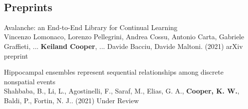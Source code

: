 \documentclass[10pt]{cooperCV2}
\begin{document}
%	






\needspace{\headerpush}
\myRule{\columnwidth}{1pt}\\


 
 
	

\subsection{Preprints} 
\begin{etaremune}[itemindent=-1.5\bibhang, topsep=0pt,
				   itemsep=\bibsep,partopsep=0pt,parsep=0pt,leftmargin={\bibhang+\widthof{[999]}}] 
    
    \item Avalanche: an End-to-End Library for Continual Learning \\
     Vincenzo Lomonaco, Lorenzo Pellegrini, Andrea Cossu, Antonio Carta, Gabriele Graffieti, ... \textbf{Keiland Cooper}, ... Davide Bacciu, Davide Maltoni. (2021) arXiv preprint 
     
	
    \item Hippocampal ensembles represent sequential relationships among discrete nonspatial events \\
     Shahbaba, B., Li, L., Agostinelli, F., Saraf, M., Elias, G. A., \textbf{Cooper, K. W.}, Baldi, P.,  Fortin, N. J.. (2021) Under Review 
     
	

\end{etaremune}

 

	
\end{document}
